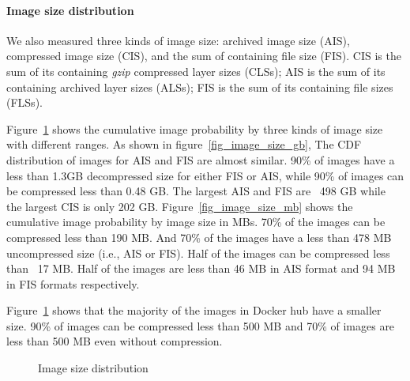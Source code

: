 \paragraph{Image size distribution}
\label{sec:image-size}
We also measured three kinds of image size: archived image size (AIS), compressed image size (CIS), and the sum of containing file size (FIS). CIS is the sum of its containing \textit{gzip} compressed layer sizes (CLSs); AIS is the sum of its containing archived layer sizes (ALSs); FIS is the sum of its containing file sizes (FLSs).

Figure~\ref{fig-image-size} shows the cumulative image probability by three kinds of image size with different ranges.
As shown in figure~\ref{fig_image_size_gb}, The CDF distribution of images for AIS and FIS are almost similar. 90\% of images have a less than 1.3GB decompressed size for either FIS or AIS, while 90\% of images can be compressed less than 0.48 GB. The largest AIS and FIS are ~498 GB while the largest CIS is only 202 GB.
Figure~\ref{fig_image_size_mb} shows the cumulative image probability by image size in MBs. 70\% of the images can be compressed less than 190 MB. And 70\% of the images have a less than 478 MB uncompressed size (i.e., AIS or FIS). Half of the images can be compressed less than ~17 MB. Half of the images are less than 46 MB in AIS format and 94 MB in FIS formats respectively.

Figure~\ref{fig-image-size} shows that the majority of the images in Docker hub have a smaller size. 90\% of images can be compressed less than 500 MB and 70\% of images are less than 500 MB even without compression. 

\begin{figure}[!t]
	\centering
	\caption{Image size distribution}
	\label{fig-image-size}
\end{figure}


